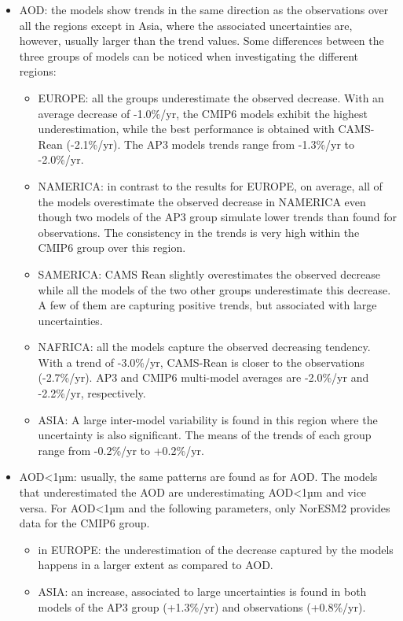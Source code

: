 \documentclass[journal abbreviation, manuscript]{copernicus}
\begin{document}
\begin{itemize}
 \item AOD: the models show trends in the same direction as the observations over all the regions except in Asia, where the associated uncertainties are, however, usually larger than the trend values. Some differences between the three groups of models can be noticed when investigating the different regions:
       \begin{itemize}
        \item EUROPE: all the groups underestimate the observed decrease. With an average decrease of -1.0\%/yr, the CMIP6 models exhibit the highest underestimation, while the best performance is obtained with CAMS-Rean (-2.1\%/yr). The AP3 models trends range from -1.3\%/yr to -2.0\%/yr.
        \item NAMERICA: in contrast to the results for EUROPE, on average, all of the models overestimate the observed decrease in NAMERICA even though two models of the AP3 group simulate lower trends than found for observations. The consistency in the trends is very high within the CMIP6 group over this region.
        \item SAMERICA: CAMS Rean slightly overestimates the observed decrease while all the models of the two other groups underestimate this decrease. A few of them are capturing positive trends, but associated with large uncertainties.
        \item NAFRICA: all the models capture the observed decreasing tendency. With a trend of -3.0\%/yr, CAMS-Rean is closer to the observations (-2.7\%/yr). AP3 and CMIP6 multi-model averages are -2.0\%/yr and -2.2\%/yr, respectively.
        \item ASIA: A large inter-model variability is found in this region where the uncertainty is also significant. The means of the trends of each group range from -0.2\%/yr to +0.2\%/yr.
       \end{itemize}
 \item AOD<1µm: usually, the same patterns are found as for AOD. The models that underestimated the AOD are underestimating AOD<1µm and vice versa. For AOD<1µm and the following parameters, only NorESM2 provides data for the CMIP6 group.
       \begin{itemize}
        \item in EUROPE: the underestimation of the decrease captured by the models happens in a larger extent as compared to AOD.
        \item ASIA: an increase, associated to large uncertainties is found in both models of the AP3 group (+1.3\%/yr) and observations (+0.8\%/yr).

\end{itemize}
\end{itemize}
\end{document}
